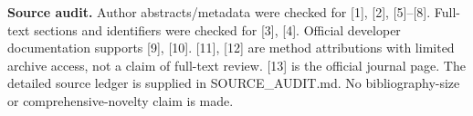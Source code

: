 \documentclass[10pt,a4paper]{article}
\begin{document}
\textbf{Source audit.} Author abstracts/metadata were checked for [1], [2], [5]--[8].
Full-text sections and identifiers were checked for [3], [4]. Official developer
documentation supports [9], [10]. [11], [12] are method attributions with limited
archive access, not a claim of full-text review. [13] is the official journal page.
The detailed source ledger is supplied in SOURCE\_AUDIT.md. No bibliography-size
or comprehensive-novelty claim is made.
\end{document}
